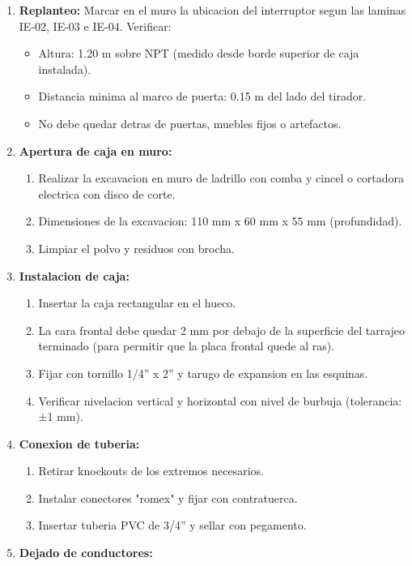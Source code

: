 \begin{enumerate}
  \item \textbf{Replanteo:} Marcar en el muro la ubicacion del interruptor segun las laminas IE-02, IE-03 e IE-04. Verificar:
  \begin{itemize}
    \item Altura: 1.20 m sobre NPT (medido desde borde superior de caja instalada).
    \item Distancia minima al marco de puerta: 0.15 m del lado del tirador.
    \item No debe quedar detras de puertas, muebles fijos o artefactos.
  \end{itemize}
  \item \textbf{Apertura de caja en muro:}
  \begin{enumerate}
    \item Realizar la excavacion en muro de ladrillo con comba y cincel o cortadora electrica con disco de corte.
    \item Dimensiones de la excavacion: 110 mm x 60 mm x 55 mm (profundidad).
    \item Limpiar el polvo y residuos con brocha.
  \end{enumerate}
  \item \textbf{Instalacion de caja:}
  \begin{enumerate}
    \item Insertar la caja rectangular en el hueco.
    \item La cara frontal debe quedar 2 mm por debajo de la superficie del tarrajeo terminado (para permitir que la placa frontal quede al ras).
    \item Fijar con tornillo 1/4'' x 2'' y tarugo de expansion en las esquinas.
    \item Verificar nivelacion vertical y horizontal con nivel de burbuja (tolerancia: ±1 mm).
  \end{enumerate}
  \item \textbf{Conexion de tuberia:}
  \begin{enumerate}
    \item Retirar knockouts de los extremos necesarios.
    \item Instalar conectores "romex" y fijar con contratuerca.
    \item Insertar tuberia PVC de 3/4'' y sellar con pegamento.
  \end{enumerate}
  \item \textbf{Dejado de conductores:}
  \begin{enumerate}

\end{enumerate}
\end{enumerate}
